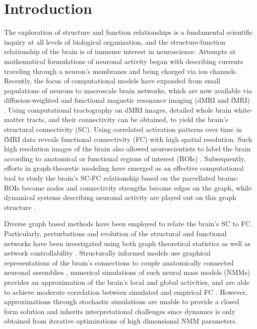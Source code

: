 \documentclass{article}
\begin{document}
\section{Introduction}
The exploration of structure and function relationships is a fundamental scientific inquiry at all levels of biological organization, and the structure-function relationship of the brain is of immense interest in neuroscience. Attempts at mathematical formulations of neuronal activity began with describing currents traveling through a neuron's membranes and being charged via ion channels\cite{hodgkin_quantitative_1952}. Recently, the focus of computational models have expanded from small populations of neurons to macroscale brain networks, which are now available via diffusion-weighted and functional magnetic resonance imaging (dMRI and fMRI) \cite{bullmore_complex_2009}. Using computational tractography on dMRI images, detailed whole brain white-matter tracts, and their connectivity can be obtained, to yield the brain's structural connectivity (SC). Using correlated activation patterns over time in fMRI data reveals functional connectivity (FC) with high spatial resolution. Such high resolution images of the brain also allowed neuroscientists to label the brain according to anatomical or functional regions of interest (ROIs) \cite{Desikan2006, craddock_whole_2012}. Subsequently, efforts in graph-theoretic modeling have emerged as an effective computational tool to study the brain's SC-FC relationship based on the parcellated brains: ROIs become nodes and connectivity strengths become edges on the graph, while dynamical systems describing neuronal activity are played out on this graph structure \cite{bassett_human_2009,bullmore_complex_2009,cao_topological_2014}.

Diverse graph based methods have been employed to relate the brain's SC to FC. Particularly, perturbations and evolution of the structural and functional networks have been investigated using both graph theoretical statistics \cite{chatterjee_understanding_2008, bassett_small-world_2006, he_structural_2008, buckner_molecular_2005, brunel_dynamics_2000, brunel_effects_2001, suarez_linking_2020} as well as network controllability \cite{gu_controllability_2015, Muldoon2016}. Structurally informed models use graphical representations of the brain's connections to couple anatomically connected neuronal assemblies \cite{Wilson1972, el_boustani_master_2009}, numerical simulations of such neural mass models (NMMs) provides an approximation of the brain's local and global activities, and are able to achieve moderate correlation between simulated and empirical FC \cite{Nunez1974, jirsa_derivation_1997, Valdes1999, Honey2009, Spiegler2013}. However, approximations through stochastic simulations are unable to provide a closed form solution and inherits interpretational challenges since dynamics is only obtained from iterative optimizations of high dimensional NMM parameters. 
\end{document}

